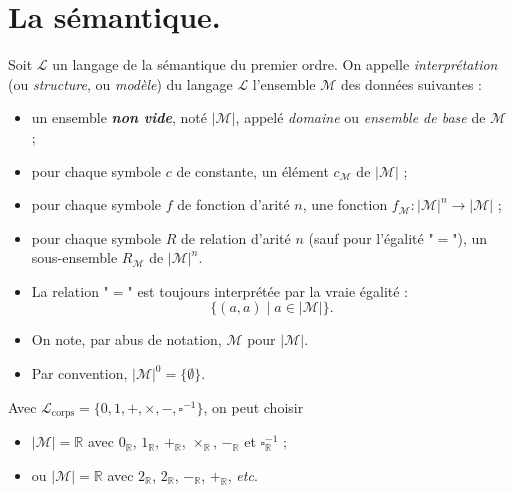 \documentclass[./main]{subfiles}
\begin{document}
  \section{La sémantique.}

  \begin{defn}
    Soit $\mathcal{L}$ un langage de la sémantique du premier ordre.
    On appelle \textit{interprétation} (ou \textit{structure}, ou \textit{modèle}) du langage $\mathcal{L}$ l'ensemble $\mathcal{M}$ des données suivantes :
    \begin{itemize}
      \item un ensemble \textit{\textbf{non vide}}, noté $|\mathcal{M}|$, appelé \textit{domaine} ou \textit{ensemble de base} de $\mathcal{M}$ ;
      \item pour chaque symbole $c$ de constante, un élément $c_{\mathcal{M}}$ de $|\mathcal{M}|$ ;
      \item pour chaque symbole $f$ de fonction d'arité $n$, une fonction $f_{\mathcal{M}} : |\mathcal{M}|^n \to |\mathcal{M}|$ ;
      \item pour chaque symbole $R$ de relation d'arité $n$ (sauf pour l'égalité "$=$"), un sous-ensemble $R_{\mathcal{M}}$ de $|\mathcal{M}|^n$.
    \end{itemize}
  \end{defn}

  \begin{rmk}
    \begin{itemize}
      \item La relation "$=$" est toujours interprétée par la vraie égalité :
        \[
        \{(a,a)  \mid a \in |\mathcal{M}|\} 
        .\]
      \item On note, par abus de notation, $\mathcal{M}$ pour $|\mathcal{M}|$.
      \item Par convention, $|\mathcal{M}|^0 = \{\emptyset\}$.
    \end{itemize}
  \end{rmk}

  \begin{exm}
      Avec $\mathcal{L}_\mathrm{corps} = \{0, 1, +, \times , -, \square^{-1}\} $, on peut choisir 
      \begin{itemize}
        \item $|\mathcal{M}| = \mathds{R}$ avec $0_\mathds{R}$, $1_\mathds{R}$, $+_\mathds{R}$, $\times_\mathds{R}$, $-_\mathds{R}$ et $\square^{-1}_\mathds{R}$ ;
        \item ou $|\mathcal{M}| = \mathds{R}$ avec $2_\mathds{R}$, $2_\mathds{R}$, $-_\mathds{R}$, $+_\mathds{R}$, \textit{etc}.
      \end{itemize}
  \end{exm}
\end{document}
